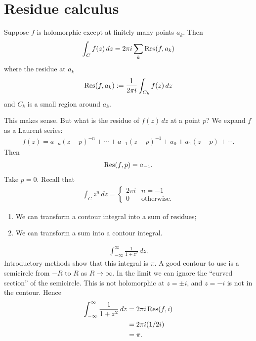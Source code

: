 \documentclass[11pt, oneside,margin=1in]{article}
\begin{document}
\section{Residue calculus}
\begin{theorem}[ ]\label{}\index{}\text{}
Suppose $f$ is holomorphic except at finitely many points $a_k$. Then 
\begin{align*}
	\int_{C}^{} f(z)  \, dz = 2\pi i \sum_{k}^{} \operatorname{Res}(f, a_k)  
\end{align*}
where the residue at $a_k$
\begin{align*}
	\operatorname{Res}(f, a_k) := \frac{1}{2\pi i} \int_{C_k}^{} f(z)  \, dz 
\end{align*}
and $C_k$ is a small region around $a_k$.
\end{theorem}

This makes sense. But what is the residue of $f(z)\,dz$ at a point $p$? We expand $f$ as a Laurent series:
\begin{align*}
	f(z) = a_{-n}(z-p)^{-n} + \cdots + a_{-1}(z-p)^{-1} + a_0 +  a_1(z-p) + \cdots.
\end{align*}
Then 
\begin{align*}
	\operatorname{Res}(f, p) = a_{-1}.
\end{align*}
Take $p=0$. Recall that
\begin{align*}
	\int_{C}^{} z^n  \, dz = 
	\begin{cases}
		2\pi i &n=-1\\
		0&\textrm{otherwise.}
	\end{cases}
\end{align*}

\begin{enumerate}
	\item We can transform a contour integral into a sum of residues;
	\item We can transform a sum into a contour integral.
\end{enumerate}

\begin{example}[ ]\label{}\text{}
\begin{align*}
	\int_{-\infty}^{\infty} \frac{1}{1+z^2}  \, dz. 
\end{align*}
Introductory methods show that this integral is $\pi$. A good contour to use is a semicircle from $-R$ to $R$ as $R\to \infty$. In the limit we can ignore the ``curved section'' of the semicircle. This is not holomorphic at $z = \pm i$, and $z=-i$ is not in the contour. Hence
\begin{align*}
	\int_{-\infty}^{\infty} \frac{1}{1+z^2}  \, dz &= 2\pi i \operatorname{Res}(f, i)\\
						       &= 2\pi i  (1/2i)\\
						       &= \pi.
\end{align*}
\end{example}
\end{document}
